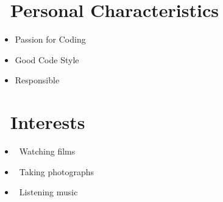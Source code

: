 \documentclass{resume}
\begin{document}
\section{\faUser\ Personal Characteristics} \vspace{1mm}

\begin{itemize}[parsep=1ex]
  \item Passion for Coding
  \item Good Code Style
  \item Responsible
\end{itemize}

\section{\faSunO\ Interests} \vspace{1mm}

\begin{itemize}[parsep=1ex]
  \item \faFilm\ {Watching films}
  \item \faCamera\ {Taking photographs}
  \item \faHeadphones\ {Listening music}
\end{itemize}

\end{document}
